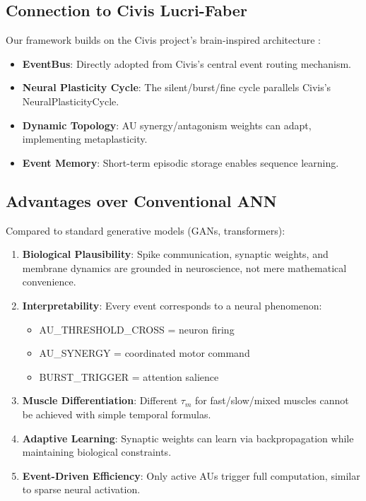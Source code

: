 \subsection{Connection to Civis Lucri-Faber}

Our framework builds on the Civis project's brain-inspired architecture \cite{civis2024}:

\begin{itemize}
\item \textbf{EventBus}: Directly adopted from Civis's central event routing mechanism.
\item \textbf{Neural Plasticity Cycle}: The silent/burst/fine cycle parallels Civis's NeuralPlasticityCycle.
\item \textbf{Dynamic Topology}: AU synergy/antagonism weights can adapt, implementing metaplasticity.
\item \textbf{Event Memory}: Short-term episodic storage enables sequence learning.
\end{itemize}

\subsection{Advantages over Conventional ANN}

Compared to standard generative models (GANs, transformers):

\begin{enumerate}
\item \textbf{Biological Plausibility}: Spike communication, synaptic weights, and membrane dynamics are grounded in neuroscience, not mere mathematical convenience.

\item \textbf{Interpretability}: Every event corresponds to a neural phenomenon:
    \begin{itemize}
    \item AU\_THRESHOLD\_CROSS = neuron firing
    \item AU\_SYNERGY = coordinated motor command
    \item BURST\_TRIGGER = attention salience
    \end{itemize}

\item \textbf{Muscle Differentiation}: Different $\tau_m$ for fast/slow/mixed muscles cannot be achieved with simple temporal formulas.

\item \textbf{Adaptive Learning}: Synaptic weights can learn via backpropagation while maintaining biological constraints.

\item \textbf{Event-Driven Efficiency}: Only active AUs trigger full computation, similar to sparse neural activation.
\end{enumerate}

